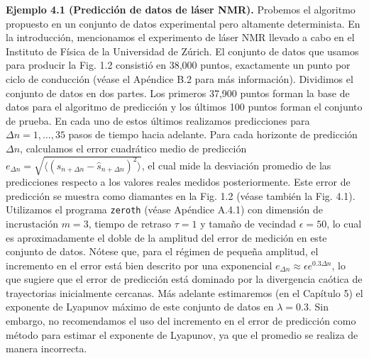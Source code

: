 \documentclass[10pt,a4paper]{book}
\begin{document}
\textbf{Ejemplo 4.1 (Predicción de datos de láser NMR).} Probemos el algoritmo propuesto en un conjunto de datos experimental pero altamente determinista. En la introducción, mencionamos el experimento de láser NMR llevado a cabo en el Instituto de Física de la Universidad de Zúrich. El conjunto de datos que usamos para producir la Fig. 1.2 consistió en 38,000 puntos, exactamente un punto por ciclo de conducción (véase el Apéndice B.2 para más información). Dividimos el conjunto de datos en dos partes. Los primeros 37,900 puntos forman la base de datos para el algoritmo de predicción y los últimos 100 puntos forman el conjunto de prueba. En cada uno de estos últimos realizamos predicciones para $\Delta n = 1, \ldots, 35$ pasos de tiempo hacia adelante. Para cada horizonte de predicción $\Delta n$, calculamos el error cuadrático medio de predicción $e_{\Delta n} = \sqrt{\langle (s_{n+\Delta n} - \hat{s}_{n+\Delta n})^2 \rangle}$, el cual mide la desviación promedio de las predicciones respecto a los valores reales medidos posteriormente. Este error de predicción se muestra como diamantes en la Fig. 1.2 (véase también la Fig. 4.1). Utilizamos el programa \texttt{zeroth} (véase Apéndice A.4.1) con dimensión de incrustación $m = 3$, tiempo de retraso $\tau = 1$ y tamaño de vecindad $\epsilon = 50$, lo cual es aproximadamente el doble de la amplitud del error de medición en este conjunto de datos. Nótese que, para el régimen de pequeña amplitud, el incremento en el error está bien descrito por una exponencial $e_{\Delta n} \approx \epsilon e^{0.3 \Delta n}$, lo que sugiere que el error de predicción está dominado por la divergencia caótica de trayectorias inicialmente cercanas. Más adelante estimaremos (en el Capítulo 5) el exponente de Lyapunov máximo de este conjunto de datos en $\lambda = 0.3$. Sin embargo, no recomendamos el uso del incremento en el error de predicción como método para estimar el exponente de Lyapunov, ya que el promedio se realiza de manera incorrecta.

\bigskip
\end{document}
